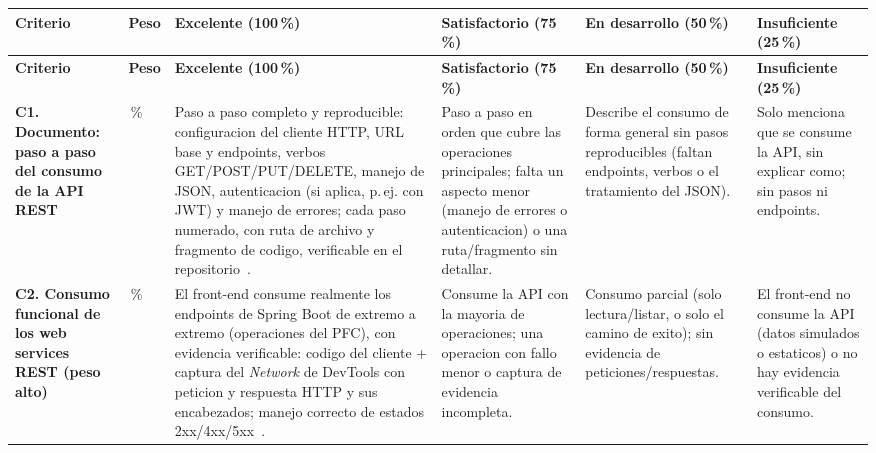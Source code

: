 \documentclass[11pt,a4paper]{article}
\begin{document}
{
\footnotesize
\renewcommand{\arraystretch}{1.3}
\begin{longtable}{|L{2.9cm}|C{0.8cm}|L{2.6cm}|L{2.6cm}|L{2.6cm}|L{2.3cm}|}
\hline
{}
{\color{white}\textbf{Criterio}} &
{\color{white}\textbf{Peso}} &
{\color{white}\textbf{Excelente (100\,\%)}} &
{\color{white}\textbf{Satisfactorio (75\,\%)}} &
{\color{white}\textbf{En desarrollo (50\,\%)}} &
{\color{white}\textbf{Insuficiente (25\,\%)}} \\
\hline
\endfirsthead

\hline
{}
{\color{white}\textbf{Criterio}} &
{\color{white}\textbf{Peso}} &
{\color{white}\textbf{Excelente (100\,\%)}} &
{\color{white}\textbf{Satisfactorio (75\,\%)}} &
{\color{white}\textbf{En desarrollo (50\,\%)}} &
{\color{white}\textbf{Insuficiente (25\,\%)}} \\
\hline
\endhead

\textbf{C1. Documento: paso a paso del consumo de la API REST} &
\,\% &
Paso a paso completo y reproducible: configuracion del cliente HTTP, URL base y endpoints, verbos GET/POST/PUT/DELETE, manejo de JSON, autenticacion (si aplica, p.\,ej. con JWT) y manejo de errores; cada paso numerado, con ruta de archivo y fragmento de codigo, verificable en el repositorio~\cite{fielding2000rest,rfc9110http,rfc8259json,jones2015jwt}. &
Paso a paso en orden que cubre las operaciones principales; falta un aspecto menor (manejo de errores o autenticacion) o una ruta/fragmento sin detallar. &
Describe el consumo de forma general sin pasos reproducibles (faltan endpoints, verbos o el tratamiento del JSON). &
Solo menciona que se consume la API, sin explicar como; sin pasos ni endpoints. \\

\textbf{C2. Consumo funcional de los web services REST (peso alto)} &
\,\% &
El front-end consume realmente los endpoints de Spring Boot de extremo a extremo (operaciones del PFC), con evidencia verificable: codigo del cliente + captura del \emph{Network} de DevTools con peticion y respuesta HTTP y sus encabezados; manejo correcto de estados 2xx/4xx/5xx~\cite{rfc9110http,owasp2021top10}. &
Consume la API con la mayoria de operaciones; una operacion con fallo menor o captura de evidencia incompleta. &
Consumo parcial (solo lectura/listar, o solo el camino de exito); sin evidencia de peticiones/respuestas. &
El front-end no consume la API (datos simulados o estaticos) o no hay evidencia verificable del consumo. \\


\end{longtable}}
\end{document}
